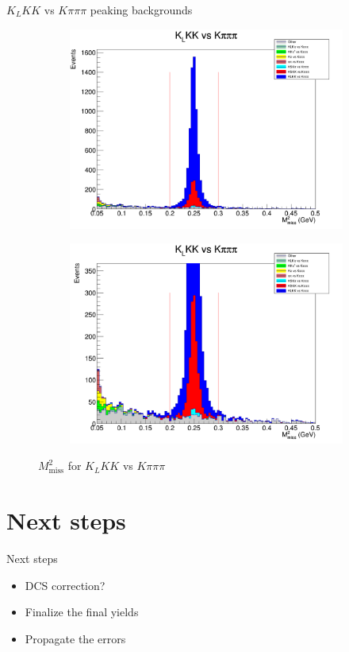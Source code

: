 \documentclass{beamer}
\begin{document}
\begin{frame}{$K_LKK$ vs $K\pi\pi\pi$ peaking backgrounds}
  \begin{figure}
    \centering
    \begin{subfigure}{0.5\textwidth}
      \centering
      \includegraphics[width=\textwidth]{KLKKVersusKpipipiPeaking.png}
    \end{subfigure}%
    \begin{subfigure}{0.5\textwidth}
      \centering
      \includegraphics[width=\textwidth]{KLKKVersusKpipipiPeaking2.png}
    \end{subfigure}
    \caption{$M^2_\text{miss}$ for $K_LKK$ vs $K\pi\pi\pi$}
  \end{figure}
\end{frame}

\section{Next steps}
\begin{frame}{Next steps}
  \begin{itemize}
    \setlength\itemsep{2em}
    \item{DCS correction?}
    \item{Finalize the final yields}
    \item{Propagate the errors}
  \end{itemize}
\end{frame}
\end{document}
